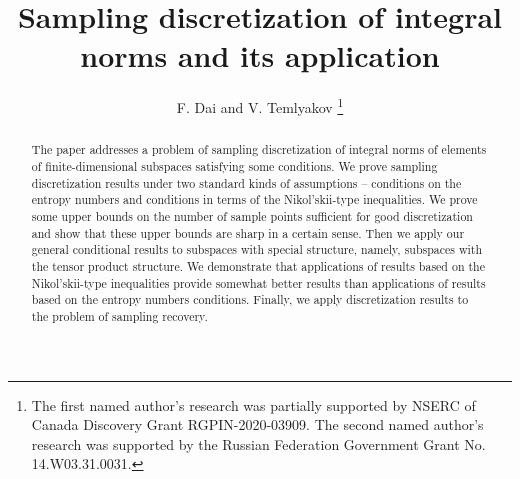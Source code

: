 \documentclass[12pt]{article}
\date{}
\numberwithin{equation}{section}
\begin{document}
\title{Sampling discretization of integral norms and its application}

\author{ F. Dai and   V. Temlyakov 	\footnote{
		The first named author's research was partially supported by NSERC of Canada Discovery Grant
		RGPIN-2020-03909.
		The second named author's research was supported by the Russian Federation Government Grant No. 14.W03.31.0031.
  }}


\newcommand{\Addresses}{{%
  \bigskip
  \footnotesize

  F.~Dai, \textsc{ Department of Mathematical and Statistical Sciences\\
University of Alberta\\ Edmonton, Alberta T6G 2G1, Canada\\
E-mail:} \texttt{fdai@ualberta.ca }

 \medskip
  V.N. Temlyakov, \textsc{University of South Carolina,\\ Steklov Institute of Mathematics,\\  Lomonosov Moscow State University,\\ and Moscow Center for Fundamental and Applied Mathematics.
  \\
E-mail:} \texttt{temlyak@math.sc.edu}

}}
\maketitle

 

\begin{abstract}
	{The paper addresses a problem of sampling discretization of integral norms of elements of finite-dimensional subspaces satisfying some conditions. We prove sampling discretization results under two standard kinds of assumptions -- conditions on the entropy numbers and  conditions in terms of the Nikol'skii-type inequalities. We prove some upper bounds on the number of sample points sufficient for good discretization and show that these upper bounds are sharp in a certain sense. Then we apply our general conditional results to subspaces with special structure, namely,
subspaces with the tensor product structure. We demonstrate that applications of results based on 
the Nikol'skii-type inequalities provide somewhat better results than applications of results based on 
 the entropy numbers conditions. Finally, we apply discretization results to the problem of sampling recovery. }
\end{abstract}
\end{document}
